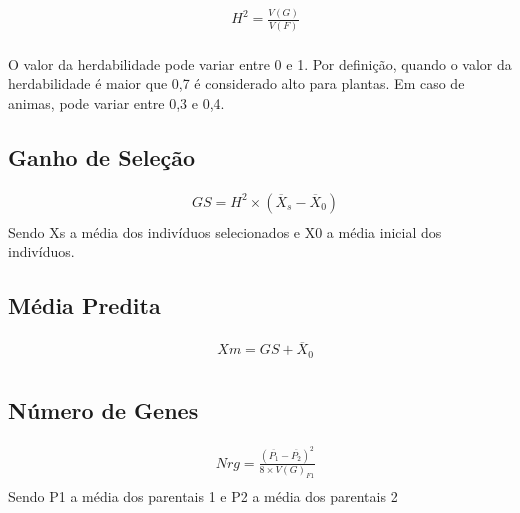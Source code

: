 \begin{definition}

\begin{align}
&  H^2 = \frac{V(G)}{V(F)} \\
\end{align}
\end{definition}

O valor da herdabilidade pode variar entre 0 e 1. Por definição, quando o valor da herdabilidade é maior que 0,7 é considerado alto para plantas. Em caso de animas, pode variar entre 0,3 e 0,4.



\subsection{Ganho de Seleção}

\begin{definition}

\begin{align}
& GS = H^2 \times (\overline{X}_s - \overline{X}_0) \\
\end{align}
Sendo Xs a média dos indivíduos selecionados e X0 a média inicial dos indivíduos.
\end{definition}


\subsection{Média Predita}

\begin{definition}

\begin{align}
& Xm = GS + \overline{X}_0 \\
\end{align}
\end{definition}


\subsection{Número de Genes}


\begin{definition}

\begin{align}
& Nrg = \frac{(\overline{P_1} - \overline{P_2})^2}{8 \times V(G)_{F1}} \\
\end{align}
Sendo P1 a média dos parentais 1 e  P2 a média dos parentais 2 
\end{definition}


